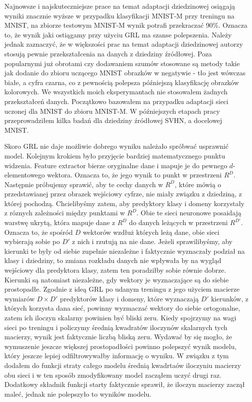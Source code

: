 \documentclass{article}
\begin{document}
\par
Najnowsze i najskuteczniejsze prace na temat adaptacji dziedzinowej osiągają wyniki znacznie wyższe w przypadku klasyfikacji MNIST-M przy treningu na MNIST, na zbiorze testowym MNIST-M wynik potrafi przekraczać 90\%. Oznacza to, że wynik jaki ostiągamy przy użyciu GRL ma szanse polepszenia. Należy jednak zaznaczyć, że w większości prac na temat adaptacji dziedzinowej autorzy stosują pewnie przekształcenia na danych z dziedziny źródłowej. Poza popularnymi już obrotami czy dodawaniem szumów stosowane są metody takie jak dodanie do zbioru uczącego MNIST obrazków w negatywie - tło jest wówczas białe, a cyfra czarna, co z pewnością polepsza późniejszą klasyfikację obrazków kolorowych. We wszystkich moich eksperymantach nie stosowałem żadnych przekształceń danych. Początkowo bazowałem na przypadku adaptacji sieci uczonej dla MNIST do zbioru MNIST-M. W późniejszych etapach pracy przeprowadziłem kilka badań dla dziedziny źródłowej SVHN, a docelowej MNIST.
\par
Skoro GRL nie daje możliwie dobrego wyniku należało spróbwać usprawnić model. Kolejnym krokiem było przyjęcie bardziej matematycznego punktu widzenia. Feature extractor bierze oryginalne dane i mapuje je do pewnego $d$-elementowego wektora. Oznacza to, że jego wynik to punkt w przestrzeni $R^{D}$. Następnie próbujemy sprawić, aby te cechy danych w $R^{D}$, które mówią o przedstawianej przez obrazek wejściowy cyfrze, nie miały związku z dziedziną, z której pochodzą. Chcielibyśmy zatem, aby predyktory klasy i domeny korzystały z róznych zależności między punktami w $R^{D}$. Obie te sieci neuronowe posaidają warstwę ukrytą, która mapuje dane z $R^{D}$ do danych leżących w przestrzeni $R^{D'}$. Oznacza to, że spośród $D$ wektorów wzdłuż których leżą dane, obie sieci wybierają sobie po $D'$ z nich i rzutują na nie dane. Jeżeli sprawilibyśmy, aby kierunki te były od siebie zupełnie niezależne i faktycznie wyznaczały podział na klasy i dziedziny, to zmiana rozkładu danych nie wpływała by na wygląd wejściowy dla predyktora klasy, zatem ten poradziłby sobie równie dobrze. Kierunki są natomiast niezależne, gdy wektory je wyznaczające są do siebie prostopadłe. Zgodnie z ideą GRL po udanym treningu z jego użyciem macierze wymiarów $D \times D'$ predyktorów klasy i domeny, które wyznaczają $D'$ kierunków, z których korzysta dana sieć, powinny wyzmaczać wektory do siebie ortogonalne, zatem ich iloczyn skalarny powinien być bliski zeru. Kiedy spojrzymy na wagi sieci po treningu i policzymy średnią kwadratów iloczynów skalarnych tych macierzy, wynik jest faktycznie liczbą bliską zeru. Wydawać by się mogło, że wymuszenie jeszcze większej prostopadłości powinno polepszyć wynik modelu, który jeszcze lepiej odfiltrowywałby informację o wyniku. W związku z tym dodałem do funkcji straty całego modelu średnią kwadrtaów iloczyniu macierzy obu sieci i w ten sposób zmodyfikowany model zacząłem uczyć drugi raz. Dodatkowy składnik funkcji starty faktycznie sprawił, że iloczyn macierzy zaczął maleć, jednak nie polepszyło to wyników modelu. 
\end{document}
